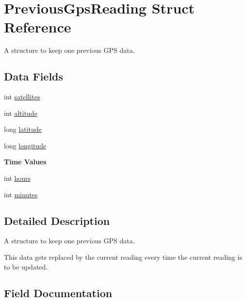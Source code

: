 \hypertarget{struct_previous_gps_reading}{}\section{Previous\+Gps\+Reading Struct Reference}
\label{struct_previous_gps_reading}


A structure to keep one previous G\+P\+S data.  


\subsection*{Data Fields}
\begin{DoxyCompactItemize}
\item 
int \hyperlink{struct_previous_gps_reading_a691915f3fb4792e167a2351c6e932483}{satellites}
\item 
int \hyperlink{struct_previous_gps_reading_a9e54ec2d7e031746f3e5b03e7c36a28e}{altitude}
\item 
long \hyperlink{struct_previous_gps_reading_a04bf03d81f573f06783641463a84ae29}{latitude}
\item 
long \hyperlink{struct_previous_gps_reading_ad3da7a89e7a97e8ccb592897339bf9c1}{longitude}
\end{DoxyCompactItemize}
\begin{Indent}{\bf Time Values}\par
\begin{DoxyCompactItemize}
\item 
int \hyperlink{struct_previous_gps_reading_af23005df06fc3cd4264e5eee2dfa2f8c}{hours}
\item 
int \hyperlink{struct_previous_gps_reading_ab693b677bdc9ded12b06daf49778101c}{minutes}
\end{DoxyCompactItemize}
\end{Indent}


\subsection{Detailed Description}
A structure to keep one previous G\+P\+S data. 

This data gets replaced by the current reading every time the current reading is to be updated. 

\subsection{Field Documentation}
\hypertarget{struct_previous_gps_reading_a9e54ec2d7e031746f3e5b03e7c36a28e}{}
